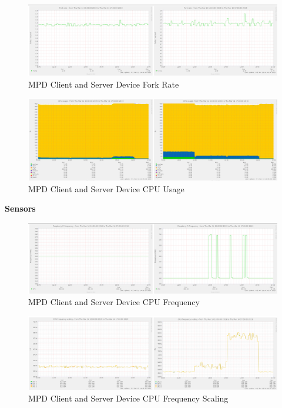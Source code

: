 \documentclass[11pt,a4paper]{scrreprt}
\begin{document}
\begin{figure}[H]
\includegraphics{ResultsAndAnalysis/MPDServerTestImages/012MPDForkRate.png}
\centering
\caption{MPD Client and Server Device Fork Rate}
\label{MPDForkRate}
\end{figure}

\begin{figure}[H]
\includegraphics{ResultsAndAnalysis/MPDServerTestImages/004MPDCPUUsage.png}
\centering
\caption{MPD Client and Server Device CPU Usage}
\label{MPDCPUUsage}
\end{figure}

\textbf{Sensors}

\begin{figure}[H]
\includegraphics{ResultsAndAnalysis/MPDServerTestImages/001MPDCPUFreq.png}
\centering
\caption{MPD Client and Server Device CPU Frequency}
\label{MPDCPUFreq}
\end{figure}

\begin{figure}[H]
\includegraphics{ResultsAndAnalysis/MPDServerTestImages/002MPDCPUFreqScaling.png}
\centering
\caption{MPD Client and Server Device CPU Frequency Scaling}
\label{MPDCPUFreqScaling}
\end{figure}
\end{document}
